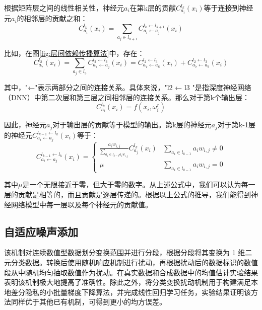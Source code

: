 根据矩阵层之间的线性相关性，神经元$a_{i}$在第k层的贡献$C_{a_{i}}^{l_{k}}\left(x_{i}\right)$等于连接到神经元$a_{i}$的相邻层的贡献之和：
\begin{equation}\label{eq:层间传播1}
C_{a_{i}}^{l_{k}}\left(x_{i}\right)=\sum_{a_{j} \in l_{k+1}} C_{a_{i} \leftarrow a_{j}}^{l_{k} \leftarrow l_{k+1}}\left(x_{i}\right)
\end{equation}

比如，在图\ref{fig:层间依赖传播算法}中，存在：
\begin{equation}\label{eq:层间传播2}
C_{a_{7}}^{l_{2}}\left(x_{i}\right)=\sum_{a_{j} \in l_{3}} C_{a_{7} \leftarrow a_{j}}^{l_{2} \leftarrow l_{3}}\left(x_{i}\right)=C_{a_{7} \leftarrow a_{8}}^{l_{2} \leftarrow l_{3}}\left(x_{i}\right)+C_{a_{7} \leftarrow a_{9}}^{l_{2} \leftarrow l_{3}}\left(x_{i}\right)
\end{equation}

其中，"←"表示两部分之间的连接关系。具体来说，"l2 ← l3 "是指深度神经网络（DNN）中第二次层和第三层之间相邻层的连接关系。那么对于第k个输出层：
\begin{equation}
C_{a_{i}}^{l_{k}}\left(x_{i}\right)=f\left(x_{i},\omega_{i}^{r}\right)
\end{equation}

因此，神经元$a_{j}$对于输出层的贡献等于模型的输出。第k层的神经元$a_{j}$对于第k-1层的神经元$C_{a_{i} \leftarrow a_{j}}^{l_{k-1} \leftarrow l_{k}}\left(x_{i}\right)$等于：
\begin{equation}
C_{a_{i} \leftarrow a_{j}}^{l_{k-1} \leftarrow l_{k}}\left(x_{i}\right)=\left\{\begin{array}{cc}\frac{a_{i} w_{i, j}}{\sum_{a_{i} \in l_{k-1} a_{i} w_{i, j}}} C_{a_{j}}^{l_{k}}\left(x_{i}\right) & \sum_{a_{i} \in l_{k-1}} a_{i} w_{i, j} \neq 0 \\ \mu & \sum_{a_{i} \in l_{k-1}} a_{i} w_{i, j}=0\end{array}\right.
\end{equation}

其中$\mu$是一个无限接近于零，但大于零的数字。从上述公式中，我们可以认为每一层的贡献是相等的，而且贡献是逐层传递的。根据以上公式的推导，我们能得到神经网络模型中每一层以及每个神经元的贡献值。


\subsection{自适应噪声添加}
该机制对连续数值型数据划分变换范围并进行分段，根据分段将其变换为 1 维二元分类数据。转换后使用随机响应机制进行扰动，再根据扰动后的数据标识的数值段从中随机均匀抽取数值作为扰动。在真实数据和合成数据中的均值估计实验结果表明该机制极大地提高了准确性。除此之外，将分类变换扰动机制用于构建满足本地差分隐私的小批量梯度下降算法，并完成线性回归学习任务，实验结果证明该方法同样优于其他已有机制，可得到更小的均方误差。

